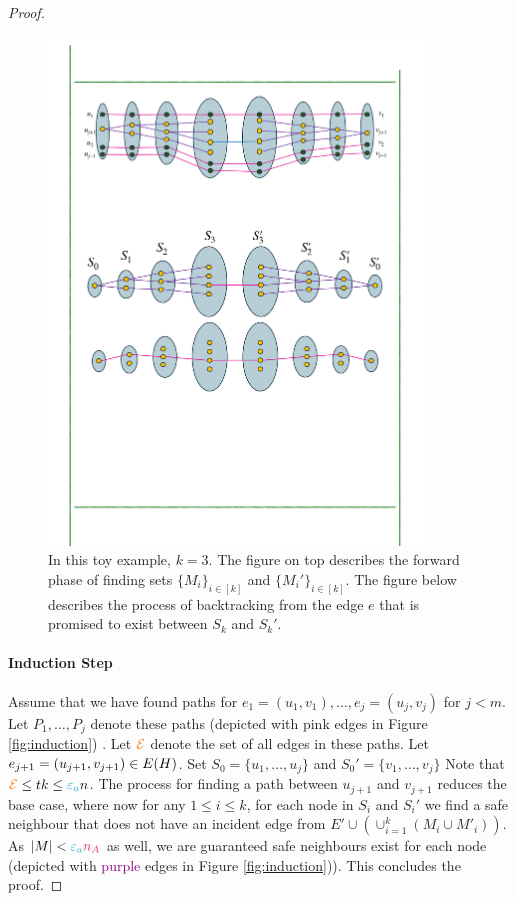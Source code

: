 \documentclass[11pt]{article}
\begin{document}
\begin{proof}
\begin{figure}
	\includegraphics[width=0.9\textwidth
	]{assets/BaseA.pdf}
	\caption{In this toy example, $k=3$. The figure on top describes the forward phase of finding sets $\{M_i\}_{i\in [k]}$ and $\{M_i'\}_{i\in [k]}$. The figure below describes the process of backtracking from the edge $e$ that is promised to exist between $S_k$ and $S_k'$.}
	\label{fig:baseB}
\end{figure}



\paragraph{Induction Step}
	
Assume that we have found paths for $e_1 = (u_1, v_1), \dots, e_j=(u_j, v_j)$ for $j < m$.
Let $P_1, \dots, P_j$ denote these paths (depicted with \textcolor{carminepink}{pink} edges in Figure \ref{fig:induction}) .
Let $\textcolor{orange}{\mathcal{E}}$ denote the set of all edges in these paths.
Let $e_{j+1} = (u_{j+1},v_{j+1}) \in E(H)$.
Set $S_0 = \{u_1, \dots, u_j\}$ and $S_0' = \{v_1, \dots, v_j\}$
Note that $\GlobalEdgeSet \leq tk \leq \epsilonA n$.
The process for finding a path between $u_{j+1}$ and $v_{j+1}$ reduces the base case, where now for any $1 \leq i \leq k$, for each node in $S_i$ and $S_i'$ we find a safe neighbour that does not have an incident  edge from $E' \cup (\cup_{i=1}^k (M_i \cup M'_i))$. As $|M| < \epsilonA\na$ as well, we are guaranteed safe neighbours exist for each node (depicted with \textcolor{purple}{purple} edges in Figure \ref{fig:induction})).
This concludes the proof.


\end{proof}
\end{document}
